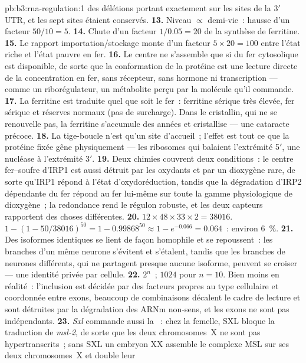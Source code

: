 \begin{solution}{pb:b3:rna-regulation:1}
des délétions portant exactement sur les sites de la 3$'$ UTR, et les
sept sites étaient conservés.
\textbf{13.} Niveau $\propto$ demi-vie~: hausse d'un facteur $50/10 = 5$.
\textbf{14.} Chute d'un facteur $1/0.05 = 20$ de la synthèse de ferritine.
\textbf{15.} Le rapport importation/stockage monte d'un facteur
$5\times 20 = 100$ entre l'état riche et l'état pauvre en fer.
\textbf{16.} Le centre ne s'assemble que si du fer cytosolique est
disponible, de sorte que la conformation de la protéine est une lecture
directe de la concentration en fer, sans récepteur, sans hormone ni
transcription --- comme un riborégulateur, un métabolite perçu par la
molécule qu'il commande.
\textbf{17.} La ferritine est traduite quel que soit le fer~: ferritine
sérique très élevée, fer sérique et réserves normaux (pas de
surcharge). Dans le cristallin, qui ne se renouvelle pas, la ferritine
s'accumule des années et cristallise --- une cataracte précoce.
\textbf{18.} La tige-boucle n'est qu'un site d'accueil~; l'effet est
tout ce que la protéine fixée gêne physiquement --- les ribosomes qui
balaient l'extrémité 5$'$, une nucléase à l'extrémité 3$'$.
\textbf{19.} Deux chimies couvrent deux conditions~: le centre
fer--soufre d'IRP1 est aussi détruit par les oxydants et par un
dioxygène rare, de sorte qu'IRP1 répond à l'état d'oxydoréduction,
tandis que la dégradation d'IRP2 dépendante du fer répond au fer
lui-même sur toute la gamme physiologique de dioxygène~; la redondance
rend le régulon robuste, et les deux capteurs rapportent des choses
différentes.
\textbf{20.} $12\times 48\times 33\times 2 = \num{38016}$. $1 - (1 -
50/\num{38016})^{50} = 1 - 0.99868^{50} \approx 1 - e^{-0.066} =
0.064$~: environ \qty{6}{\%}.
\textbf{21.} Des isoformes identiques se lient de façon homophile et se
repoussent~: les branches d'un même neurone s'évitent et s'étalent,
tandis que les branches de neurones différents, qui ne partagent
presque aucune isoforme, peuvent se croiser --- une identité privée par
cellule.
\textbf{22.} $2^{n}$~; $\num{1024}$ pour $n = 10$. Bien moins en
réalité~: l'inclusion est décidée par des facteurs propres au type
cellulaire et coordonnée entre exons, beaucoup de combinaisons
décalent le cadre de lecture et sont détruites par la dégradation des
ARNm non-sens, et les exons ne sont pas indépendants.
\textbf{23.} \emph{Sxl} commande aussi la ~: chez la
femelle, SXL bloque la traduction de \emph{msl-2}, de sorte que les
deux chromosomes~X ne sont pas hypertranscrits~; sans SXL un embryon XX
assemble le complexe MSL sur ses deux chromosomes~X et double leur

\end{solution}
